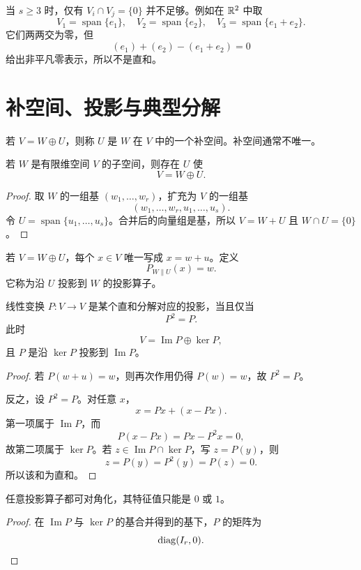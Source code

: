 \begin{pitfall}[两两交为零不足以保证多个子空间直和]
当 $s\ge3$ 时，仅有 $V_i\cap V_j=\{0\}$ 并不足够。例如在 $\mathbb{R}^2$ 中取
\[
V_1=\operatorname{span}\{e_1\},\quad
V_2=\operatorname{span}\{e_2\},\quad
V_3=\operatorname{span}\{e_1+e_2\}.
\]
它们两两交为零，但
\[
(e_1)+(e_2)-(e_1+e_2)=0
\]
给出非平凡零表示，所以不是直和。
\end{pitfall}

\section{补空间、投影与典型分解}

\begin{definition}[补空间]
若 $V=W\oplus U$，则称 $U$ 是 $W$ 在 $V$ 中的一个补空间。补空间通常不唯一。
\end{definition}

\begin{theorem}[有限维子空间总有补空间]
若 $W$ 是有限维空间 $V$ 的子空间，则存在 $U$ 使
\[
V=W\oplus U.
\]
\end{theorem}
\begin{proof}
取 $W$ 的一组基 $(w_1,\ldots,w_r)$，扩充为 $V$ 的一组基
\[
(w_1,\ldots,w_r,u_1,\ldots,u_s).
\]
令 $U=\operatorname{span}\{u_1,\ldots,u_s\}$。合并后的向量组是基，所以 $V=W+U$ 且 $W\cap U=\{0\}$。
\end{proof}

\begin{definition}[沿补空间的投影]
若 $V=W\oplus U$，每个 $x\in V$ 唯一写成 $x=w+u$。定义
\[
P_{W\parallel U}(x)=w.
\]
它称为沿 $U$ 投影到 $W$ 的投影算子。
\end{definition}

\begin{theorem}[投影算子的代数判据]
线性变换 $P:V\to V$ 是某个直和分解对应的投影，当且仅当
\[
P^2=P.
\]
此时
\[
V=\operatorname{Im}P\oplus\ker P,
\]
且 $P$ 是沿 $\ker P$ 投影到 $\operatorname{Im}P$。
\end{theorem}
\begin{proof}
若 $P(w+u)=w$，则再次作用仍得 $P(w)=w$，故 $P^2=P$。

反之，设 $P^2=P$。对任意 $x$，
\[
x=Px+(x-Px).
\]
第一项属于 $\operatorname{Im}P$，而
\[
P(x-Px)=Px-P^2x=0,
\]
故第二项属于 $\ker P$。若 $z\in\operatorname{Im}P\cap\ker P$，写 $z=P(y)$，则
\[
z=P(y)=P^2(y)=P(z)=0.
\]
所以该和为直和。
\end{proof}

\begin{corollary}
任意投影算子都可对角化，其特征值只能是 $0$ 或 $1$。
\end{corollary}
\begin{proof}
在 $\operatorname{Im}P$ 与 $\ker P$ 的基合并得到的基下，$P$ 的矩阵为
\[
\operatorname{diag}(I_r,0).
\]
\end{proof}

